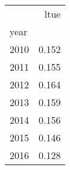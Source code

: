 \begin{tabular}{lr}
\toprule
 & ltue \\
year &  \\
\midrule
2010 & 0.152 \\
2011 & 0.155 \\
2012 & 0.164 \\
2013 & 0.159 \\
2014 & 0.156 \\
2015 & 0.146 \\
2016 & 0.128 \\
\bottomrule
\end{tabular}
